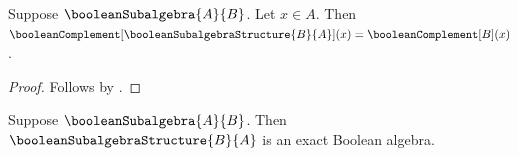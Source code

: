 \begin{proposition}\label{boolean_subalgebra_structure_complement_apply}
    Suppose $\booleanSubalgebra{A}{B}$.
    Let $x\in A$.
    Then $\booleanComplement[\booleanSubalgebraStructure{B}{A}](x)
        =\booleanComplement[B](x)$.
\end{proposition}
\begin{proof}
    Follows by
        .
\end{proof}

\begin{theorem}\label{boolean_subalgebra_structure_is_exact_boolean_algebra}
    Suppose $\booleanSubalgebra{A}{B}$.
    Then $\booleanSubalgebraStructure{B}{A}$
        is an exact Boolean algebra.
\end{theorem}
